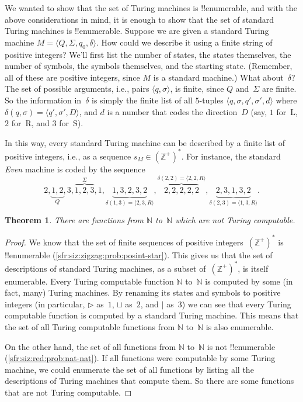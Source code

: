\documentclass[10pt,a4paper]{article}
\theoremstyle{plain}
\newtheorem{thm}{Theorem}[section]
\theoremstyle{definition}
\theoremstyle{remark}
\newenvironment{explain}{}{}
\providecommand{\tuple}[1]{\langle #1 \rangle}
\providecommand{\Nat}{\ensuremath{\mathbb{N}}}
\providecommand{\PosInt}{\mathbb{Z}^{+}}
\providecommand{\TMblank}{\sqcup}
\providecommand{\TMstroke}{\mid}
\providecommand{\TMstay}{\mathrm{S}}
\providecommand{\TMright}{\mathrm{R}}
\providecommand{\TMleft}{\mathrm{L}}
\providecommand{\TMendtape}{\triangleright}
\providecommand{\cref}[1]{\ref{#1}}
\begin{document}
\begin{explain}
We wanted to show that the set of Turing machines is !!{enumerable},
and with the above considerations in mind, it is enough to show that
the set of standard Turing machines is !!{enumerable}. Suppose we are
given a standard Turing machine $M = \tuple{Q, \Sigma, q_0, \delta}$.
How could we describe it using a finite string of positive integers?
We'll first list the number of states, the states themselves, the
number of symbols, the symbols themselves, and the starting state.
(Remember, all of these are positive integers, since $M$ is a standard
machine.)  What about~$\delta$? The set of possible arguments, i.e.,
pairs $\tuple{q,\sigma}$, is finite, since $Q$ and~$\Sigma$ are
finite. So the information in~$\delta$ is simply the finite list of
all $5$-tuples $\tuple{q, \sigma, q', \sigma', d}$ where
$\delta(q,\sigma) = \tuple{q', \sigma', D}$, and $d$ is a number that
codes the direction~$D$ (say, $1$ for~$\TMleft$, $2$ for~$\TMright$,
and $3$ for~$\TMstay$).

In this way, every standard Turing machine can be described by a
finite list of positive integers, i.e., as a sequence $s_M \in
(\PosInt)^*$. For instance, the standard \emph{Even} machine is coded
by the sequence
\[
2, \underbrace{1, 2}_Q, 3, \overbrace{1, 2, 3}^\Sigma, 1, \underbrace{1, 3, 2, 3, 2}_{\delta(1,3) = \tuple{2,3,R}}, 
\overbrace{2, 2, 2, 2, 2}^{\delta(2,2) = \tuple{2,2,R}},
\underbrace{2, 3, 1, 3, 2}_{\delta(2,3) = \tuple{1,3,R}}.
\]
\end{explain}

\begin{thm}
There are functions from $\Nat$ to~$\Nat$ which are not Turing
computable.
\end{thm}

\begin{proof}
We know that the set of finite sequences of positive
integers~$(\PosInt)^*$ is !!{enumerable}
(\cref{sfr:siz:zigzag:prob:posint-star}). This gives us that the set
of descriptions of standard Turing machines, as a subset
of~$(\PosInt)^*$, is itself enumerable.  Every Turing computable
function $\Nat$ to~$\Nat$ is computed by some (in fact, many) Turing
machines. By renaming its states and symbols to positive integers (in
particular, $\TMendtape$ as~$1$, $\TMblank$ as~$2$, and $\TMstroke$
as~$3$) we can see that every Turing computable function is computed
by a standard Turing machine. This means that the set of all Turing
computable functions from $\Nat$ to~$\Nat$ is also enumerable.

On the other hand, the set of all functions from $\Nat$ to~$\Nat$ is
not !!{enumerable} (\cref{sfr:siz:red:prob:nat-nat}). If all functions
were computable by some Turing machine, we could enumerate the set of
all functions by listing all the descriptions of Turing machines that
compute them. So there are some functions that are not Turing
computable. 
\end{proof}
\end{document}
